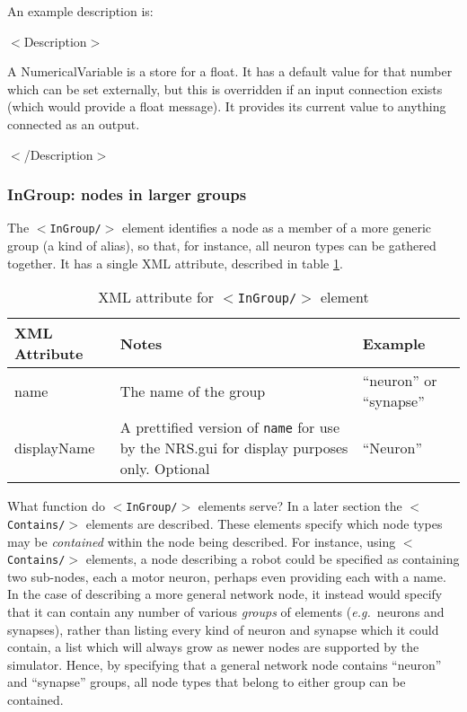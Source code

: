 \documentclass[pdftex,a4paper]{article}
\newcommand{\eg}{{\em e.g.\ }}
\newcommand{\XML}[2][]{{\tt \small $<$#2#1/$>$}}
\newcommand{\XMLfont}[1]{{\tt \small #1}}
\newcommand{\XMLtext}[1]{
  \begin{tt}
    \begin{small}
      \begin{list}{}{
          \setlength{\topsep}{0pt}
          \setlength{\partopsep}{0pt}
          \setlength{\itemsep}{0pt}
          \setlength{\parsep}{0pt}
          \setlength{\leftmargin}{2em}
          \setlength{\rightmargin}{2em}
          \setlength{\labelsep}{0pt}
        }
      \item #1
      \end{list}
    \end{small}
  \end{tt}
}
\newcommand{\XMLfull}[3][]{\XMLtext{$<$#2#1$>$
    #3
  \item $<$/#2$>$}}
\begin{document}
An example description is:

\XMLfull{Description}{
  \XMLtext{A NumericalVariable is a store for a float. It has a
  default value for that number which can be set externally, but this
  is overridden if an input connection exists (which would provide a
  float message). It provides its current value to anything connected
  as an output.}
}

\subsubsection{InGroup: nodes in larger groups}

The \XML{InGroup} element identifies a node as a member of a more
generic group (a kind of alias), so that, for instance, all neuron
types can be gathered together. It has a single XML attribute,
described in table \ref{tab:ingroup}.

\begin{table}[!h]
  \begin{center}
    \caption{XML attribute for \XML{InGroup} element}
    \label{tab:ingroup}
    \begin{tabular}{|l|p{6cm}|l|}
      \hline

      \textbf{XML Attribute} & \textbf{Notes} & \textbf{Example}\\

      \hline

      name & The name of the group & ``neuron'' or ``synapse''\\

      \hline

      displayName & A prettified version of \XMLfont{name} for use by
      the NRS.gui for display purposes only. Optional & ``Neuron'' \\

      \hline
    \end{tabular}
  \end{center}
\end{table}

What function do \XML{InGroup} elements serve? In a later section the
\XML{Contains} elements are described. These elements specify which
node types may be {\em contained} within the node being described. For
instance, using \XML{Contains} elements, a node describing a robot
could be specified as containing two sub-nodes, each a motor neuron,
perhaps even providing each with a name. In the case of describing a
more general network node, it instead would specify that it can
contain any number of various {\em groups} of elements (\eg neurons
and synapses), rather than listing every kind of neuron and synapse
which it could contain, a list which will always grow as newer nodes
are supported by the simulator. Hence, by specifying that a general
network node contains ``neuron'' and ``synapse'' groups, all node
types that belong to either group can be contained.
\end{document}
